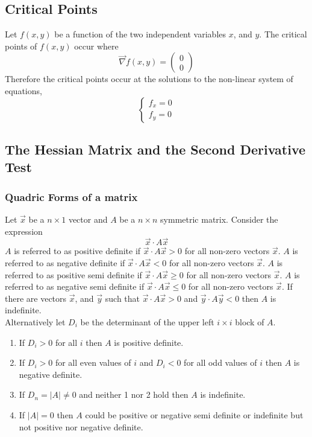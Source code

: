 \documentclass[14pt]{article}
\begin{document}
    \subsection{Critical Points}
    Let $f(x,y)$ be a function of the two independent variables $x$, and
    $y$. The critical points of $f(x,y)$ occur where
    $$\vec\nabla f(x,y)=\begin{pmatrix} 0\\0 \end{pmatrix}$$ Therefore
        the critical points occur at the solutions to the non-linear
        system of equations,
    $$\left\{\begin{array}{lr} f_x=0\\
        f_y=0 \end{array}\right.$$
    \subsection{The Hessian Matrix and the Second Derivative Test}
    \subsubsection{Quadric Forms of a matrix}
    Let $\vec x$ be a $n\times1$ vector and $A$ be a $n\times n$
    symmetric matrix. Consider the expression
    $$\vec x \cdot A \vec x$$ $A$ is referred to as positive definite if
    $\vec x \cdot A \vec x>0$ for all non-zero vectors $\vec x$. $A$ is
    referred to as negative definite if $\vec x \cdot A \vec x<0$ for
    all non-zero vectors $\vec x$. $A$ is referred to as positive semi
    definite if $\vec x \cdot A \vec x\geq0$ for all non-zero vectors
    $\vec x$. $A$ is referred to as negative semi definite if $\vec x
    \cdot A \vec x\leq0$ for all non-zero vectors $\vec x$. If there are
    vectors $\vec x$, and $\vec y$ such that $\vec x \cdot A \vec x>0$
    and $\vec y \cdot A \vec y<0$ then $A$ is indefinite.\\
    Alternatively let $D_i$ be the determinant of the upper left
    $i\times i$ block of $A$.
    \begin{enumerate}
        \item If $D_i>0$ for all $i$ then $A$ is positive definite.
        \item If $D_i>0$ for all even values of $i$ and $D_i<0$ for all
        odd values of $i$ then $A$ is negative definite.
        \item If $D_n=|A|\neq0$ and neither 1 nor 2 hold then $A$ is
        indefinite.
        \item If $|A|=0$ then $A$ could be positive or negative semi
        definite or indefinite but not positive nor negative definite.
    \end{enumerate}
\end{document}
